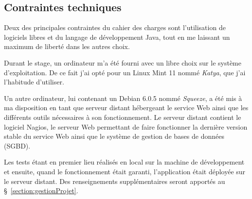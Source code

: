 \subsection{Contraintes techniques}

Deux des principales contraintes du cahier des charges sont l'utilisation de logiciels libres et du langage de d\'eveloppement Java, tout en me laissant un maximum de libert\'e dans les autres choix.

Durant le stage, un ordinateur m'a \'et\'e fourni avec un libre choix sur le syst\`eme d'exploitation.
De ce fait j'ai opt\'e pour un Linux Mint 11 nomm\'e \textit{Katya}, que j'ai l'habitude d'utiliser.

Un autre ordinateur, lui contenant un Debian 6.0.5 nomm\'e \textit{Squeeze}, a \'et\'e mis \`a ma disposition en tant que serveur distant h\'ebergeant le service Web ainsi que les diff\'erents outils n\'ecessaires \`a son fonctionnement.
Le serveur distant contient le logiciel Nagios, le serveur Web permettant de faire fonctionner la derni\`ere version stable du service Web ainsi que le syst\`eme de gestion de bases de donn\'ees (SGBD).

Les tests \'etant en premier lieu r\'ealis\'es en local sur la machine de d\'eveloppement et ensuite, quand le fonctionnement \'etait garanti, l'application \'etait d\'eploy\'ee sur le serveur distant.
Des renseignements suppl\'ementaires seront apport\'es au \S~\ref{section:gestionProjet}.


\clearpage